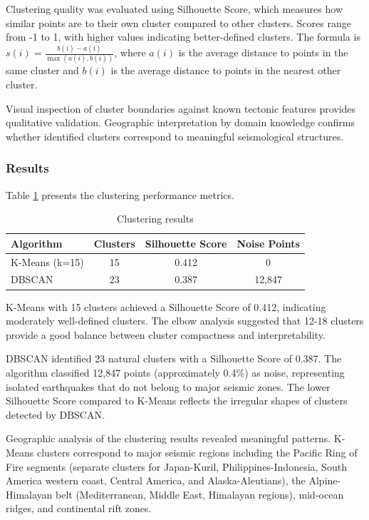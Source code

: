 Clustering quality was evaluated using Silhouette Score, which measures how similar points are to their own cluster compared to other clusters. Scores range from -1 to 1, with higher values indicating better-defined clusters. The formula is $s(i) = \frac{b(i) - a(i)}{\max(a(i), b(i))}$, where $a(i)$ is the average distance to points in the same cluster and $b(i)$ is the average distance to points in the nearest other cluster.

Visual inspection of cluster boundaries against known tectonic features provides qualitative validation. Geographic interpretation by domain knowledge confirms whether identified clusters correspond to meaningful seismological structures.

\subsubsection{Results}

Table \ref{tab:clustering_results} presents the clustering performance metrics.

\begin{table}[H]
\centering
\caption{Clustering results}
\label{tab:clustering_results}
\begin{tabular}{|l|c|c|c|}
\hline
\textbf{Algorithm} & \textbf{Clusters} & \textbf{Silhouette Score} & \textbf{Noise Points} \\
\hline
K-Means (k=15) & 15 & 0.412 & 0 \\
DBSCAN & 23 & 0.387 & 12,847 \\
\hline
\end{tabular}
\end{table}

K-Means with 15 clusters achieved a Silhouette Score of 0.412, indicating moderately well-defined clusters. The elbow analysis suggested that 12-18 clusters provide a good balance between cluster compactness and interpretability.

DBSCAN identified 23 natural clusters with a Silhouette Score of 0.387. The algorithm classified 12,847 points (approximately 0.4\%) as noise, representing isolated earthquakes that do not belong to major seismic zones. The lower Silhouette Score compared to K-Means reflects the irregular shapes of clusters detected by DBSCAN.

Geographic analysis of the clustering results revealed meaningful patterns. K-Means clusters correspond to major seismic regions including the Pacific Ring of Fire segments (separate clusters for Japan-Kuril, Philippines-Indonesia, South America western coast, Central America, and Alaska-Aleutians), the Alpine-Himalayan belt (Mediterranean, Middle East, Himalayan regions), mid-ocean ridges, and continental rift zones.

